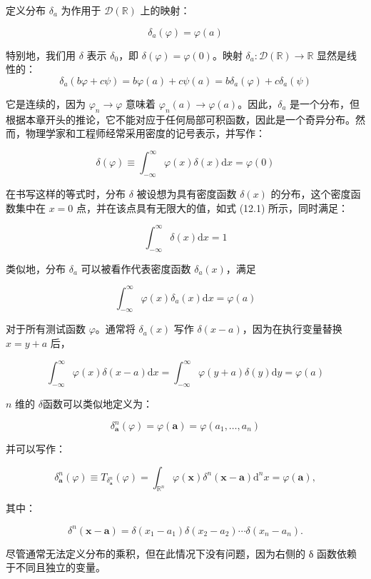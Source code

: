 \begin{eg}\label{eg:12.2}
定义分布 $\delta_a$ 为作用于 $\mathcal{D}(\mathbb{R})$ 上的映射：

$$
\delta_a(\varphi) = \varphi(a)
$$

特别地，我们用 $\delta$ 表示 $\delta_0$，即
$\delta(\varphi) = \varphi(0)$。映射
$\delta_a: \mathcal{D}(\mathbb{R}) \to \mathbb{R}$ 显然是线性的：
\begin{equation}\label{eq:12.2}
  \delta_a(b \varphi + c \psi) = b \varphi(a) + c \psi(a) = b \delta_a(\varphi) + c \delta_a(\psi)
\end{equation}

它是连续的，因为 $\varphi_n \to \varphi$ 意味着
$\varphi_n(a) \to \varphi(a)$。因此，$\delta_a$
是一个分布，但根据本章开头的推论，它不能对应于任何局部可积函数，因此是一个奇异分布。然而，物理学家和工程师经常采用密度的记号表示，并写作：

$$
\delta(\varphi) \equiv \int_{-\infty}^\infty \varphi(x) \delta(x) \mathrm{d}x = \varphi(0)
$$

在书写这样的等式时，分布 $\delta$ 被设想为具有密度函数 $\delta(x)$
的分布，这个密度函数集中在 $x = 0$ 点，并在该点具有无限大的值，如式
(12.1) 所示，同时满足：

$$
\int_{-\infty}^\infty \delta(x) \mathrm{d}x = 1
$$

类似地，分布 $\delta_a$ 可以被看作代表密度函数 $\delta_a(x)$，满足

$$
\int_{-\infty}^\infty \varphi(x) \delta_a(x) \mathrm{d}x = \varphi(a)
$$

对于所有测试函数 $\varphi$。通常将 $\delta_a(x)$ 写作
$\delta(x-a)$，因为在执行变量替换 $x = y + a$ 后，

$$
\int_{-\infty}^\infty \varphi(x) \delta(x-a) \mathrm{d}x = \int_{-\infty}^\infty \varphi(y+a) \delta(y) \mathrm{d}y = \varphi(a)
$$

$n$ 维的 $\delta$函数可以类似地定义为：

$$
\delta_\mathbf{a}^n(\varphi) = \varphi(\mathbf{a}) = \varphi(a_1, \ldots, a_n)
$$

并可以写作：

$$
\delta_\mathbf{a}^n(\varphi) \equiv T_{\delta_\mathbf{a}^n}(\varphi) = \int_{\mathbb{R}^n} \varphi(\mathbf{x}) \delta^n(\mathbf{x} - \mathbf{a}) \mathrm{d}^n x = \varphi(\mathbf{a}),
$$

其中：

$$
\delta^n(\mathbf{x} - \mathbf{a}) = \delta(x_1 - a_1) \delta(x_2 - a_2) \cdots \delta(x_n - a_n).
$$

尽管通常无法定义分布的乘积，但在此情况下没有问题，因为右侧的 δ
函数依赖于不同且独立的变量。
\end{eg}

